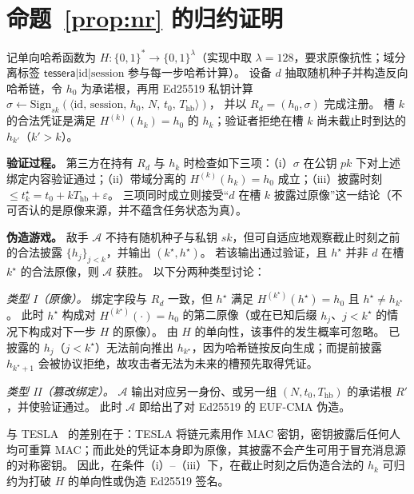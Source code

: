 \documentclass[manuscript,screen,review]{acmart}
\begin{document}
\appendix
\section{命题~\ref{prop:nr} 的归约证明}
\label{app:nr}

记单向哈希函数为 $H:\{0,1\}^\ast\to\{0,1\}^\lambda$（实现中取 $\lambda{=}128$，要求原像抗性；域分离标签 $\mathsf{tessera}|\mathrm{id}|\mathrm{session}$ 参与每一步哈希计算）。
设备 $d$ 抽取随机种子并构造反向哈希链，令 $h_0$ 为承诺根，再用 Ed25519 私钥计算
$\sigma\leftarrow\mathrm{Sign}_{sk}(\langle\mathrm{id},\,\mathrm{session},\,h_0,\,N,\,t_0,\,T_{\mathrm{hb}}\rangle)$，
并以 $R_d=(h_0,\sigma)$ 完成注册。
槽 $k$ 的合法凭证是满足 $H^{(k)}(h_k)=h_0$ 的 $h_k$；验证者拒绝在槽 $k$ 尚未截止时到达的 $h_{k'}$（$k'>k$）。

\textbf{验证过程。}
第三方在持有 $R_d$ 与 $h_k$ 时检查如下三项：（i）$\sigma$ 在公钥 $pk$ 下对上述绑定内容验证通过；（ii）带域分离的 $H^{(k)}(h_k)=h_0$ 成立；（iii）披露时刻 $\le t_k^\star=t_0+k T_{\mathrm{hb}}+\varepsilon$。
三项同时成立则接受``$d$ 在槽 $k$ 披露过原像''这一结论（不可否认的是原像来源，并不蕴含任务状态为真）。

\textbf{伪造游戏。}
敌手 $\mathcal{A}$ 不持有随机种子与私钥 $sk$，但可自适应地观察截止时刻之前的合法披露 $\{h_j\}_{j<k}$，并输出 $(k^\star,h^\star)$。
若该输出通过验证，且 $h^\star$ 并非 $d$ 在槽 $k^\star$ 的合法原像，则 $\mathcal{A}$ 获胜。
以下分两种类型讨论：

\emph{类型 I（原像）。}
绑定字段与 $R_d$ 一致，但 $h^\star$ 满足 $H^{(k^\star)}(h^\star)=h_0$ 且 $h^\star\neq h_{k^\star}$。
此时 $h^\star$ 构成对 $H^{(k^\star)}(\cdot)=h_0$ 的第二原像（或在已知后缀 $h_j$、$j<k^\star$ 的情况下构成对下一步 $H$ 的原像）。
由 $H$ 的单向性，该事件的发生概率可忽略。
已披露的 $h_j$（$j<k^\star$）无法前向推出 $h_{k^\star}$，因为哈希链按反向生成；而提前披露 $h_{k^\star+1}$ 会被协议拒绝，故攻击者无法为未来的槽预先取得凭证。

\emph{类型 II（篡改绑定）。}
$\mathcal{A}$ 输出对应另一身份、或另一组 $(N,t_0,T_{\mathrm{hb}})$ 的承诺根 $R'$，并使验证通过。
此时 $\mathcal{A}$ 即给出了对 Ed25519 的 EUF-CMA 伪造。

与 TESLA~\cite{tesla2001,rfc4082} 的差别在于：TESLA 将链元素用作 MAC 密钥，密钥披露后任何人均可重算 MAC；而此处的凭证本身即为原像，其披露不会产生可用于冒充消息源的对称密钥。
因此，在条件（i）--（iii）下，在截止时刻之后伪造合法的 $h_k$ 可归约为打破 $H$ 的单向性或伪造 Ed25519 签名。
\end{document}
